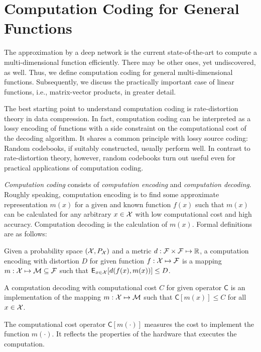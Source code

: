\documentclass[twocolumn]{IEEEtran}
\def\expect{\mathop{\mbox{$\mathsf{E}$}}}
\begin{document}
\section{Computation Coding for General Functions}
\label{gencomcod}

The approximation by a deep network is the current state-of-the-art to compute a multi-dimensional function efficiently. There may be other ones, yet undiscovered, as well. Thus, we define computation coding for general multi-dimensional functions. Subsequently, we discuss the practically important case of linear functions, i.e., matrix-vector products, in greater detail.

The best starting point to understand computation coding is rate-distortion theory in data compression. In fact, computation coding can be interpreted as a lossy encoding of functions with a side constraint on the computational cost of the decoding algorithm. It shares a common principle with lossy source coding: Random codebooks, if suitably constructed, usually perform well. In contrast to rate-distortion theory, however, random codebooks turn out useful even for practical applications of computation coding.

{\it Computation coding} consists of {\it computation encoding} and {\it computation decoding}. Roughly speaking, computation encoding is to find some approximate representation $m(x)$ for a given and known function $f(x)$ such that $m(x)$ can be calculated for any arbitrary $x\in {\cal X}$ with low computational cost and high accuracy. Computation decoding is the calculation of $m(x)$. Formal definitions are as follows:

\begin{definition}
\label{def1}
Given a probability space $({\cal X},P_{\cal X})$ and a metric $d:{\cal F} \times {\cal F}\mapsto \mathbb{R}$, a computation encoding with distortion $D$ for given function $f:{\cal X}\mapsto {\cal F}$ is a mapping $m:{\cal X} \mapsto {\cal M\subseteq F}$ such that $\expect_{x\in {\cal X}} [d(f(x),m(x))]\le D$.
\end{definition}
\begin{definition}
\label{def2}
A computation decoding with computational cost $C$ for given operator $\mathsf C$ is an implementation of the mapping $m:{\cal X}\mapsto {\cal M}$ such that $\mathsf C[m(x)]\le C$ for all $x\in{\cal X}$.
\end{definition}

The computational cost operator $\mathsf C[m(\cdot)]$ measures the cost to implement the function $m(\cdot)$. It reflects the properties of the hardware that executes the computation. 
\end{document}
